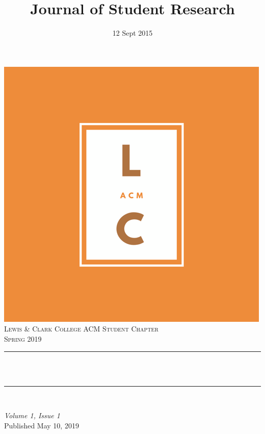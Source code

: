 \documentclass[12pt, letterpaper]{article}
\title{Journal of Student Research}								%
\author{ }								%
\date{12 Sept 2015}											%
\makeatletter
\let\thetitle\@title
\makeatother
\begin{document}

\begin{titlepage}
	\centering
    \vspace*{0.5 cm}
    \includegraphics[scale = 0.4]{logo.png}\\[1.0 cm]	%
    \textsc{\LARGE Lewis \& Clark College ACM Student Chapter}\\[2.0 cm]	%
	\textsc{\Large Spring 2019}\\[0.5 cm]				%
	\rule{\linewidth}{0.2 mm} \\[0.4 cm]
	{ \huge \bfseries \thetitle}\\
	\rule{\linewidth}{0.2 mm} \\[1.5 cm]
	
	\begin{minipage}{0.4\textwidth}
		\begin{flushleft} \large
			\emph{Volume 1, Issue 1}\\
			Published May 10, 2019\\
			
          \end{flushleft}
			\end{minipage}
        

\end{titlepage}
\end{document}

